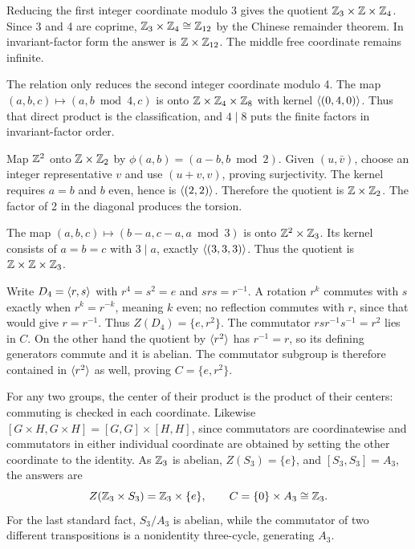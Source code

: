 Reducing the first integer coordinate modulo 3 gives the quotient $\mathbb{Z}_3\times\mathbb{Z}\times\mathbb{Z}_4$. Since 3 and 4 are coprime, $\mathbb{Z}_3\times\mathbb{Z}_4\cong\mathbb{Z}_{12}$ by the Chinese remainder theorem. In invariant-factor form the answer is $\mathbb{Z}\times\mathbb{Z}_{12}$. The middle free coordinate remains infinite.

The relation only reduces the second integer coordinate modulo 4. The map $(a,b,c)\mapsto(a,b\bmod4,c)$ is onto $\mathbb{Z}\times\mathbb{Z}_4\times\mathbb{Z}_8$ with kernel $\langle (0,4,0)\rangle$. Thus that direct product is the classification, and $4\mid8$ puts the finite factors in invariant-factor order.

Map $\mathbb{Z}^2$ onto $\mathbb{Z}\times\mathbb{Z}_2$ by $\phi(a,b)=(a-b,b\bmod2)$. Given $(u,\bar v)$, choose an integer representative $v$ and use $(u+v,v)$, proving surjectivity. The kernel requires $a=b$ and $b$ even, hence is $\langle (2,2)\rangle$. Therefore the quotient is $\mathbb{Z}\times\mathbb{Z}_2$. The factor of 2 in the diagonal produces the torsion.

The map $(a,b,c)\mapsto(b-a,c-a,a\bmod3)$ is onto $\mathbb{Z}^2\times\mathbb{Z}_3$. Its kernel consists of $a=b=c$ with $3\mid a$, exactly $\langle (3,3,3)\rangle$. Thus the quotient is $\mathbb{Z}\times\mathbb{Z}\times\mathbb{Z}_3$.

Write $D_4=\langle r,s\rangle$ with $r^4=s^2=e$ and $srs=r^{-1}$. A rotation $r^k$ commutes with $s$ exactly when $r^k=r^{-k}$, meaning $k$ even; no reflection commutes with $r$, since that would give $r=r^{-1}$. Thus $Z(D_4)=\{e,r^2\}$.
The commutator $rsr^{-1}s^{-1}=r^2$ lies in $C$. On the other hand the quotient by $\langle r^2\rangle$ has $r^{-1}=r$, so its defining generators commute and it is abelian. The commutator subgroup is therefore contained in $\langle r^2\rangle$ as well, proving $C=\{e,r^2\}$.

For any two groups, the center of their product is the product of their centers: commuting is checked in each coordinate. Likewise $[G\times H,G\times H]=[G,G]\times[H,H]$, since commutators are coordinatewise and commutators in either individual coordinate are obtained by setting the other coordinate to the identity. As $\mathbb{Z}_3$ is abelian, $Z(S_3)=\{e\}$, and $[S_3,S_3]=A_3$, the answers are
\[Z(\mathbb{Z}_3\times S_3)=\mathbb{Z}_3\times\{e\},\qquad C=\{0\}\times A_3\cong\mathbb{Z}_3.\]
For the last standard fact, $S_3/A_3$ is abelian, while the commutator of two different transpositions is a nonidentity three-cycle, generating $A_3$.


